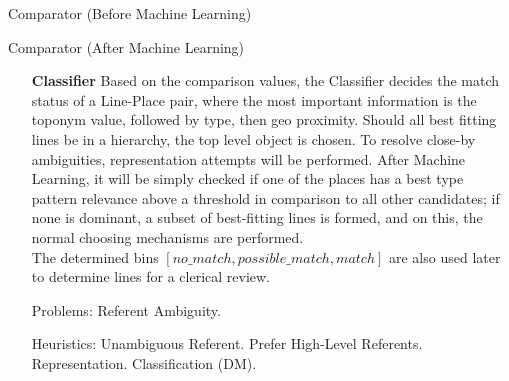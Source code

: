 \documentclass[11pt]{article}
\begin{document}
\newpage
\begin{algorithm}[H]

\caption{Comparator (Before Machine Learning)}
\end{algorithm}
\vspace{0.5cm}
\begin{algorithm}[H]

\caption{Comparator (After Machine Learning)}
\end{algorithm}

\newpage

\begin{itemize}
\item[\textbf{Classifier}] Based on the comparison values, the Classifier decides the match status of a Line-Place pair, where the most important information is the toponym value, followed by type, then geo proximity. Should all best fitting lines be in a hierarchy, the top level object is chosen. To resolve close-by ambiguities, representation attempts will be performed. After Machine Learning, it will be simply checked if one of the places has a best type pattern relevance above a threshold in comparison to all other candidates; if none is dominant, a subset of best-fitting lines is formed, and on this, the normal choosing mechanisms are performed.\\
The determined bins $[no\_match, possible\_match, match]$ are also used later to determine lines for a clerical review.
\item[Problems:] Referent Ambiguity.
\item[Heuristics:] Unambiguous Referent. Prefer High-Level Referents. Representation. Classification (DM).
\end{itemize}
\end{document}
